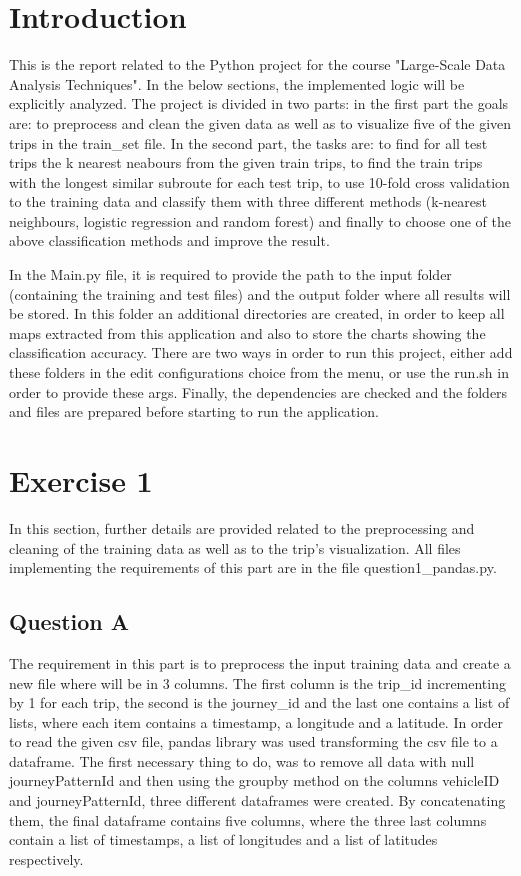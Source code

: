 \documentclass[12pt]{article}
\begin{document}
	\section{Introduction}
    This is the report related to the Python project for the course "Large-Scale Data Analysis Techniques". In the below sections, the implemented logic will be explicitly analyzed. The project is divided in two parts: in the first part the goals are: to preprocess and clean the given data as well as to visualize five of the given trips in the train\_set file. In the second part, the tasks are: to find for all test trips the k nearest neabours from the given train trips, to find the train trips with the longest similar subroute for each test trip, to use 10-fold cross validation to the training data and classify them with three different methods (k-nearest neighbours, logistic regression and random forest) and finally to choose one of the above classification methods and improve the result.
    
    In the Main.py file, it is required to provide the path to the input folder (containing the training and test files) and the output folder where all results will be stored. In this folder an additional directories are created, in order to keep all maps extracted from this application and also to store the charts showing the classification accuracy. There are two ways in order to run this project, either add these folders in the edit configurations choice from the menu, or use the run.sh in order to provide these args. Finally, the dependencies are checked and the folders and files are prepared before starting to run the application.
    
	\section{Exercise 1}
	In this section, further details are provided related to the preprocessing and cleaning of the training data as well as to the trip's visualization. All files implementing the requirements of this part are in the file question1\_pandas.py.
	
	\subsection{Question A}
	The requirement in this part is to preprocess the input training data and create a new file where will be in 3 columns. The first column is the trip\_id incrementing by 1 for each trip, the second is the journey\_id and the last one contains a list of lists, where each item contains a timestamp, a longitude and a latitude. In order to read the given csv file, pandas library was used transforming the csv file to a dataframe. The first necessary thing to do, was to remove all data with null journeyPatternId and then using the groupby method on the columns vehicleID and journeyPatternId, three different dataframes were created. By concatenating them, the final dataframe contains five columns, where the three last columns contain a list of timestamps, a list of longitudes and a list of latitudes respectively.
	
\end{document}
